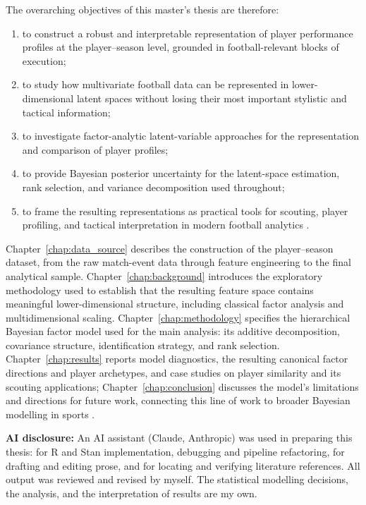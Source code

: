 \documentclass{fmetfm}
\begin{document}
The overarching objectives of this master's thesis are therefore:
\begin{enumerate}
  \item to construct a robust and interpretable representation of player performance profiles at the player--season level, grounded in football-relevant blocks of execution;
  \item to study how multivariate football data can be represented in lower-dimensional latent spaces without losing their most important stylistic and tactical information;
  \item to investigate factor-analytic latent-variable approaches for the representation and comparison of player profiles;
  \item to provide Bayesian posterior uncertainty for the latent-space estimation, rank selection, and variance decomposition used throughout;
  \item to frame the resulting representations as practical tools for scouting, player profiling, and tactical interpretation in modern football analytics \cite{teixeira2025mapping,orucc2024analysis}.
\end{enumerate}

Chapter~\ref{chap:data_source} describes the construction of the player--season dataset, from the raw match-event data through feature engineering to the final analytical sample. Chapter~\ref{chap:background} introduces the exploratory methodology used to establish that the resulting feature space contains meaningful lower-dimensional structure, including classical factor analysis and multidimensional scaling. Chapter~\ref{chap:methodology} specifies the hierarchical Bayesian factor model used for the main analysis: its additive decomposition, covariance structure, identification strategy, and rank selection. Chapter~\ref{chap:results} reports model diagnostics, the resulting canonical factor directions and player archetypes, and case studies on player similarity and its scouting applications; Chapter~\ref{chap:conclusion} discusses the model's limitations and directions for future work, connecting this line of work to broader Bayesian modelling in sports \cite{baio2010bayesian,ribeiro2025bayesian,swinton2023bayesian}.

\textbf{AI disclosure:} An AI assistant (Claude, Anthropic) was used in preparing this thesis: for R and Stan implementation, debugging and pipeline refactoring, for drafting and editing prose, and for locating and verifying literature references. All output was reviewed and revised by myself. The statistical modelling decisions, the analysis, and the interpretation of results are my own.
\end{document}
